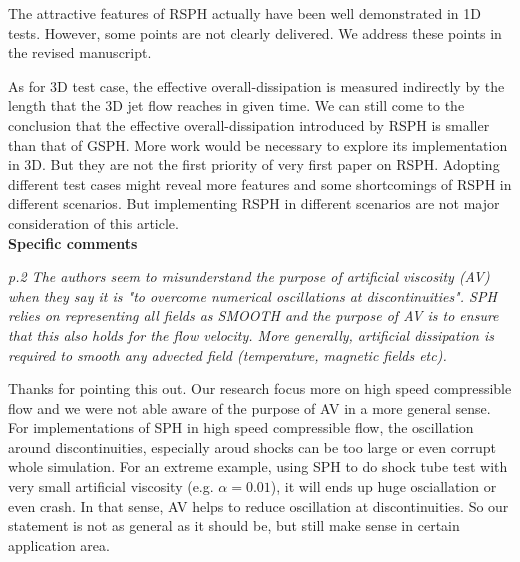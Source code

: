 \documentclass[10pt,a4paper]{article}
\begin{document}
The attractive features of RSPH actually have been well demonstrated in 1D tests. However, some points are not clearly delivered. We address these points in the revised manuscript.

As for 3D test case, the effective overall-dissipation is measured indirectly by the length that the 3D jet flow reaches in given time. We can still come to the conclusion that the effective overall-dissipation introduced by RSPH is smaller than that of GSPH. More work would be necessary to explore its implementation in 3D. But they are not the first priority of very first paper on RSPH. Adopting different test cases might reveal more features and some shortcomings of RSPH in different scenarios. But implementing RSPH in different scenarios are not major consideration of this article.
\\[12pt]

\textbf{\large Specific comments}

\textit{p.2 The authors seem to misunderstand the purpose of artificial viscosity (AV) when they say it is "to overcome numerical oscillations at
discontinuities". SPH relies on representing all fields as SMOOTH and the purpose of AV is to ensure that this also holds for the flow velocity.
More generally, artificial dissipation is required to smooth any advected field (temperature, magnetic fields etc).}

Thanks for pointing this out. Our research focus more on high speed compressible flow and we were not able aware of the purpose of AV in a more general sense. For implementations of SPH in high speed compressible flow, the oscillation around discontinuities, especially aroud shocks can be too large or even corrupt whole simulation. For an extreme example, using SPH to do shock tube test with very small artificial viscosity (e.g. $\alpha = 0.01$), it will ends up huge osciallation or even crash. In that sense, AV helps to reduce oscillation at discontinuities. So our statement is not as general as it should be, but still make sense in certain application area.
\\[3pt]
\end{document}
